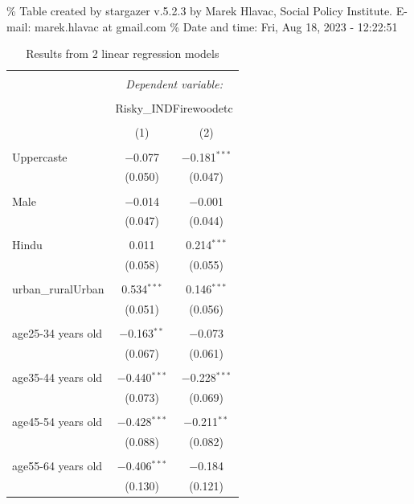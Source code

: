 \documentclass[
]{article}
\begin{document}
\begingroup\setlength{\tabcolsep}{1pt}\renewcommand{\arraystretch}{0.7}

\% Table created by stargazer v.5.2.3 by Marek Hlavac, Social Policy
Institute. E-mail: marek.hlavac at gmail.com \% Date and time: Fri, Aug
18, 2023 - 12:22:51

\begin{table}[!htbp] \centering 
  \caption{Results from 2 linear regression models} 
  \label{} 
\begin{tabular}{@{\extracolsep{5pt}}lcc} 
\\[-1.8ex]\hline 
\hline \\[-1.8ex] 
 & \multicolumn{2}{c}{\textit{Dependent variable:}} \\ 
\cline{2-3} 
\\[-1.8ex] & \multicolumn{2}{c}{Risky\_INDFirewoodetc} \\ 
\\[-1.8ex] & (1) & (2)\\ 
\hline \\[-1.8ex] 
 Uppercaste & $-$0.077 & $-$0.181$^{***}$ \\ 
  & (0.050) & (0.047) \\ 
  & & \\ 
 Male & $-$0.014 & $-$0.001 \\ 
  & (0.047) & (0.044) \\ 
  & & \\ 
 Hindu & 0.011 & 0.214$^{***}$ \\ 
  & (0.058) & (0.055) \\ 
  & & \\ 
 urban\_ruralUrban & 0.534$^{***}$ & 0.146$^{***}$ \\ 
  & (0.051) & (0.056) \\ 
  & & \\ 
 age25-34 years old & $-$0.163$^{**}$ & $-$0.073 \\ 
  & (0.067) & (0.061) \\ 
  & & \\ 
 age35-44 years old & $-$0.440$^{***}$ & $-$0.228$^{***}$ \\ 
  & (0.073) & (0.069) \\ 
  & & \\ 
 age45-54 years old & $-$0.428$^{***}$ & $-$0.211$^{**}$ \\ 
  & (0.088) & (0.082) \\ 
  & & \\ 
 age55-64 years old & $-$0.406$^{***}$ & $-$0.184 \\ 
  & (0.130) & (0.121) \\ 

\end{tabular}
\end{table}
\end{document}

